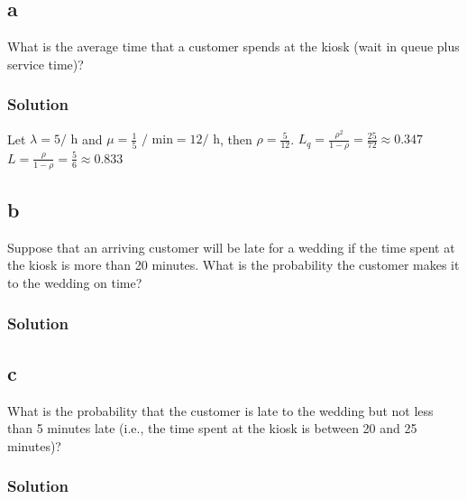 \documentclass[letterpaper]{amsart}
\begin{document}
\subsection*{a}
What is the average time that a customer spends at the kiosk (wait in
queue plus service time)?
\subsubsection*{Solution}
Let
$\lambda=5/\text{ h}$ and $\mu=\frac{1}{5}\text{ / min}=12/\text{ h}$,
then $\rho=\frac{5}{12}$.
$L_q=\frac{\rho^2}{1-\rho}=\frac{25}{72}\approx 0.347$
$L=\frac{\rho}{1-\rho}=\frac{5}{6}\approx 0.833$
\subsection*{b}
Suppose that an arriving customer will be late for a wedding if the time
spent at the kiosk is more than 20 minutes. What is the probability the
customer makes it to the wedding on time?
\subsubsection*{Solution}
\subsection*{c}
What is the probability that the customer is late to the wedding but not
less than 5 minutes late (i.e., the time spent at the kiosk is between 20
and 25 minutes)?
\subsubsection*{Solution}
\end{document}
